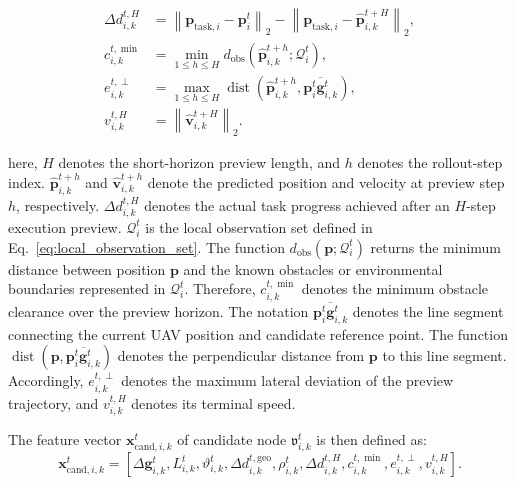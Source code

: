 \begin{equation}
    \label{eq:preview_execution_features}
    \begin{aligned}
        \Delta d_{i,k}^{t,H}
        &=
        \left\|
            \mathbf{p}_{\mathrm{task},i}
            -
            \mathbf{p}_{i}^{t}
        \right\|_{2}
        -
        \left\|
            \mathbf{p}_{\mathrm{task},i}
            -
            \hat{\mathbf{p}}_{i,k}^{t+H}
        \right\|_{2}, \\
        c_{i,k}^{t,\min}
        &=
        \min_{1\leq h\leq H}
        d_{\mathrm{obs}}
        \left(
            \hat{\mathbf{p}}_{i,k}^{t+h};
            \mathcal{Q}_{i}^{t}
        \right), \\
        e_{i,k}^{t,\perp}
        &=
        \max_{1\leq h\leq H}
        \operatorname{dist}
        \left(
            \hat{\mathbf{p}}_{i,k}^{t+h},
            \overline{\mathbf{p}_{i}^{t}\mathbf{g}_{i,k}^{t}}
        \right), \\
        v_{i,k}^{t,H}
        &=
        \left\|
            \hat{\mathbf{v}}_{i,k}^{t+H}
        \right\|_{2}.
    \end{aligned}
\end{equation}

\noindent
here, $H$ denotes the short-horizon preview length, and $h$ denotes the rollout-step index. $\hat{\mathbf{p}}_{i,k}^{t+h}$ and $\hat{\mathbf{v}}_{i,k}^{t+h}$ denote the predicted position and velocity at preview step $h$, respectively. $\Delta d_{i,k}^{t,H}$ denotes the actual task progress achieved after an $H$-step execution preview. $\mathcal{Q}_{i}^{t}$ is the local observation set defined in Eq.~\eqref{eq:local_observation_set}. The function $d_{\mathrm{obs}}(\mathbf{p};\mathcal{Q}_{i}^{t})$ returns the minimum distance between position $\mathbf{p}$ and the known obstacles or environmental boundaries represented in $\mathcal{Q}_{i}^{t}$. Therefore, $c_{i,k}^{t,\min}$ denotes the minimum obstacle clearance over the preview horizon. The notation $\overline{\mathbf{p}_{i}^{t}\mathbf{g}_{i,k}^{t}}$ denotes the line segment connecting the current UAV position and candidate reference point. The function $\operatorname{dist}(\mathbf{p},\overline{\mathbf{p}_{i}^{t}\mathbf{g}_{i,k}^{t}})$ denotes the perpendicular distance from $\mathbf{p}$ to this line segment. Accordingly, $e_{i,k}^{t,\perp}$ denotes the maximum lateral deviation of the preview trajectory, and $v_{i,k}^{t,H}$ denotes its terminal speed.

The feature vector $\mathbf{x}_{\mathrm{cand},i,k}^{t}$ of candidate node $\mathfrak{v}_{i,k}^{t}$ is then defined as:
\begin{equation}
    \label{eq:execution_aware_candidate_node}
    \mathbf{x}_{\mathrm{cand},i,k}^{t}
    =
    \left[
        \Delta\mathbf{g}_{i,k}^{t},
        L_{i,k}^{t},
        \vartheta_{i,k}^{t},
        \Delta d_{i,k}^{t,\mathrm{geo}},
        \rho_{i,k}^{t},
        \Delta d_{i,k}^{t,H},
        c_{i,k}^{t,\min},
        e_{i,k}^{t,\perp},
        v_{i,k}^{t,H}
    \right].
\end{equation}

